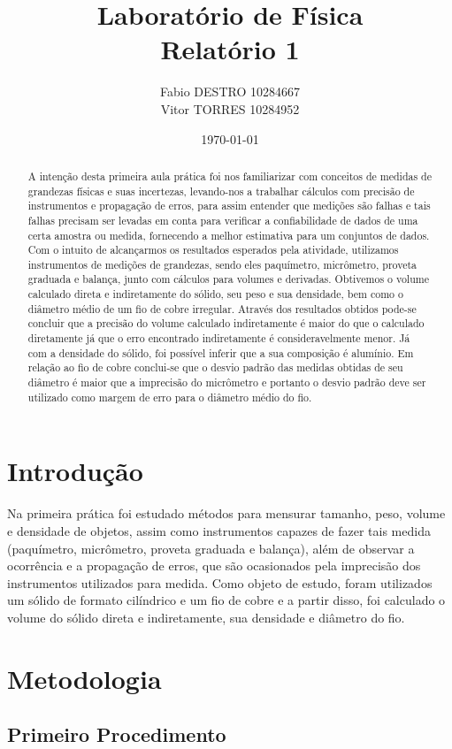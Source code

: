 \documentclass{article}
\title{
{\huge Laboratório de Física}\\{\Large Relatório 1}}
\author{Fabio DESTRO 10284667\\Vitor TORRES 10284952\\}
\date{\today}
\begin{document}
\begin{abstract}
\indent
A intenção desta primeira aula prática foi nos familiarizar com conceitos de medidas de grandezas físicas e suas incertezas, levando-nos a trabalhar cálculos com precisão de instrumentos e propagação de erros,
para assim entender que medições são falhas e tais falhas precisam ser levadas em conta para verificar a confiabilidade de dados de uma certa amostra ou medida, fornecendo a melhor estimativa para um conjuntos de dados.
Com o intuito de alcançarmos os resultados esperados pela atividade, utilizamos instrumentos de medições de grandezas, sendo eles paquímetro, micrômetro, proveta graduada e balança, junto com cálculos para volumes e derivadas.
Obtivemos o volume calculado direta e indiretamente do sólido, seu peso e sua densidade, bem como o diâmetro médio de um fio de cobre irregular.
Através dos resultados obtidos pode-se concluir que a precisão do volume calculado indiretamente é maior do que o calculado diretamente já que o erro encontrado indiretamente é consideravelmente menor. Já com a densidade do sólido, foi possível inferir que a sua composição é alumínio. Em relação ao fio de cobre conclui-se que o desvio padrão das medidas obtidas de seu diâmetro é maior que a imprecisão do micrômetro e portanto o desvio padrão deve ser utilizado como margem de erro para o diâmetro médio do fio.

\end{abstract}
\newpage
\section{Introdução}
\indent

Na primeira prática foi estudado métodos para mensurar tamanho, peso, volume e densidade de objetos, assim como instrumentos capazes de fazer tais medida (paquímetro, micrômetro, proveta graduada e balança), além de observar a ocorrência e a propagação de erros, que são ocasionados pela imprecisão dos instrumentos utilizados para medida.
Como objeto de estudo, foram utilizados um sólido de formato cilíndrico e um fio de cobre e a partir disso, foi calculado o volume do sólido direta e indiretamente, sua densidade e diâmetro do fio.

\section{Metodologia}
\subsection{Primeiro Procedimento}
\indent
\end{document}
